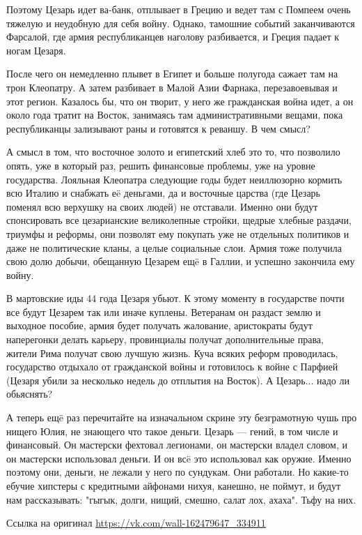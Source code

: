 Поэтому Цезарь идет ва-банк, отплывает в Грецию и ведет там с Помпеем очень тяжелую и неудобную для себя войну. Однако, тамошние событий заканчиваются Фарсалой, где армия республиканцев наголову разбивается, и Греция падает к ногам Цезаря.


После чего он немедленно плывет в Египет и больше полугода сажает там на трон Клеопатру. А затем разбивает в Малой Азии Фарнака, перезавоевывая и этот регион. Казалось бы, что он творит, у него же гражданская война идет, а он около года тратит на Восток, занимаясь там административными вещами, пока республиканцы зализывают раны и готовятся к реваншу. В чем смысл?


А смысл в том, что восточное золото и египетский хлеб это то, что позволило опять, уже в который раз, решить финансовые проблемы, уже на уровне государства. Лояльная Клеопатра следующие годы будет неиллюзорно кормить всю Италию и снабжать еë деньгами, да и восточные царства (где Цезарь поменял всю верхушку на своих людей) не отставали. Именно они будут спонсировать все цезарианские великолепные стройки, щедрые хлебные раздачи, триумфы и реформы, они позволят ему покупать уже не отдельных политиков и даже не политические кланы, а целые социальные слои. Армия тоже получила свою долю добычи, обещанную Цезарем ещë в Галлии, и успешно закончила ему войну.


В мартовские иды 44 года Цезаря убьют. К этому моменту в государстве почти все будут Цезарем так или иначе куплены. Ветеранам он раздаст землю и выходное пособие, армия будет получать жалование, аристократы будут наперегонки делать карьеру, провинциалы получат дополнительные права, жители Рима получат свою лучшую жизнь. Куча всяких реформ проводилась, государство отдыхало от гражданской войны и готовилось к войне с Парфией (Цезаря убили за несколько недель до отплытия на Восток). А Цезарь... надо ли обьяснять?


А теперь ещë раз перечитайте на изначальном скрине эту безграмотную чушь про нищего Юлия, не знающего что такое деньги. Цезарь — гений, в том числе и финансовый. Он мастерски фехтовал легионами, он мастерски владел словом, и он мастерски использовал деньги. И он всë это использовал как оружие. Именно поэтому они, деньги, не лежали у него по сундукам. Они работали. Но какие-то ебучие хипстеры с кредитными айфонами нихуя, канешно, не поймут, и будут нам рассказывать: "гыгык, долги, нищий, смешно, салат лох, ахаха". Тьфу на них.

Ссылка на оригинал \url{https://vk.com/wall-162479647_334911}
